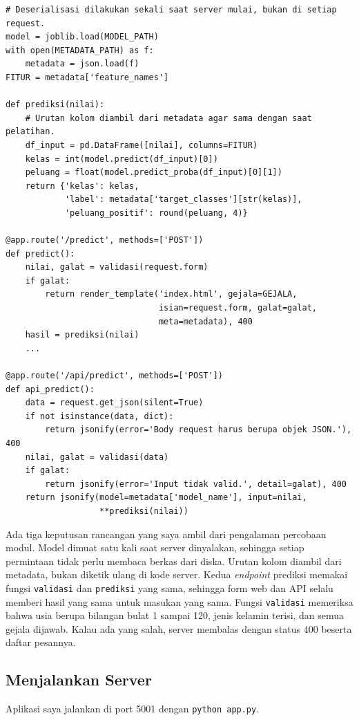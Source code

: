 \documentclass[a4paper,oneside,12pt]{report}
\begin{document}
\begin{lstlisting}[style=pythonstyle,caption={Pemuatan model, fungsi inferensi, dan \textit{endpoint} pada \texttt{app.py}.}]
# Deserialisasi dilakukan sekali saat server mulai, bukan di setiap request.
model = joblib.load(MODEL_PATH)
with open(METADATA_PATH) as f:
    metadata = json.load(f)
FITUR = metadata['feature_names']

def prediksi(nilai):
    # Urutan kolom diambil dari metadata agar sama dengan saat pelatihan.
    df_input = pd.DataFrame([nilai], columns=FITUR)
    kelas = int(model.predict(df_input)[0])
    peluang = float(model.predict_proba(df_input)[0][1])
    return {'kelas': kelas,
            'label': metadata['target_classes'][str(kelas)],
            'peluang_positif': round(peluang, 4)}

@app.route('/predict', methods=['POST'])
def predict():
    nilai, galat = validasi(request.form)
    if galat:
        return render_template('index.html', gejala=GEJALA,
                               isian=request.form, galat=galat,
                               meta=metadata), 400
    hasil = prediksi(nilai)
    ...

@app.route('/api/predict', methods=['POST'])
def api_predict():
    data = request.get_json(silent=True)
    if not isinstance(data, dict):
        return jsonify(error='Body request harus berupa objek JSON.'), 400
    nilai, galat = validasi(data)
    if galat:
        return jsonify(error='Input tidak valid.', detail=galat), 400
    return jsonify(model=metadata['model_name'], input=nilai,
                   **prediksi(nilai))
\end{lstlisting}

Ada tiga keputusan rancangan yang saya ambil dari pengalaman percobaan modul. Model dimuat satu kali saat server dinyalakan, sehingga setiap permintaan tidak perlu membaca berkas dari diska. Urutan kolom diambil dari metadata, bukan diketik ulang di kode server. Kedua \textit{endpoint} prediksi memakai fungsi \texttt{validasi} dan \texttt{prediksi} yang sama, sehingga form web dan API selalu memberi hasil yang sama untuk masukan yang sama. Fungsi \texttt{validasi} memeriksa bahwa usia berupa bilangan bulat 1 sampai 120, jenis kelamin terisi, dan semua gejala dijawab. Kalau ada yang salah, server membalas dengan status 400 beserta daftar pesannya.

\subsection{Menjalankan Server}
Aplikasi saya jalankan di port 5001 dengan \texttt{python app.py}.
\end{document}
